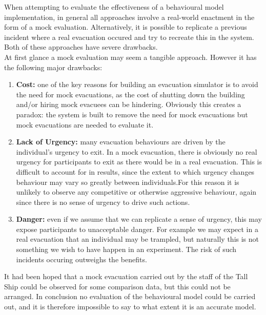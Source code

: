 When attempting to evaluate the effectiveness of a behavioural model implementation, in general all approaches involve a real-world enactment in the form of a mock evaluation. Alternatively, it is possible to replicate a previous incident where a real evacuation occured and try to recreate this in the system. Both of these approaches have severe drawbacks.\\

At first glance a mock evaluation may seem a tangible approach. However it has the following major drawbacks:
\begin{enumerate}
\item{\textbf{Cost:} one of the key reasons for building an evacuation simulator is to avoid the need for mock evacuations, as the cost of shutting down the building and/or hiring mock evacuees can be hindering. Obviously this creates a paradox: the system is built to remove the need for mock evacuations but mock evacuations are needed to evaluate it.}
\item{\textbf{Lack of Urgency:} many evacuation behaviours are driven by the individual's urgency to exit. In a mock evacuation, there is obviously no real urgency for participants to exit as there would be in a real evacuation. This is difficult to account for in results, since the extent to which urgency changes behaviour may vary so greatly between individuals.For this reason it is unlikely to observe any competitive or otherwise aggressive behaviour, again since there is no sense of urgency to drive such actions.}
\item{\textbf{Danger:} even if we assume that we can replicate a sense of urgency, this may expose participants to unacceptable danger. For example we may expect in a real evacuation that an individual may be trampled, but naturally this is not something we wish to have happen in an experiment. The risk of such incidents occuring outweighs the benefits.}
\end{enumerate}
It had been hoped that a mock evacuation carried out by the staff of the Tall Ship could be observed for some comparison data, but this could not be arranged. In conclusion no evaluation of the behavioural model could be carried out, and it is therefore impossible to say to what extent it is an accurate model.

